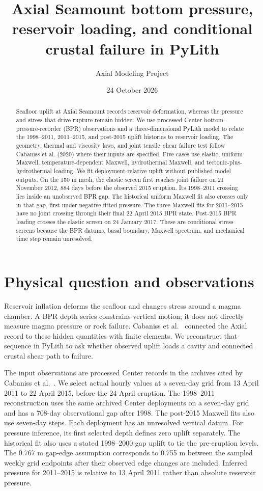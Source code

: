 \documentclass[10pt]{article}
\title{Axial Seamount bottom pressure, reservoir loading, and conditional crustal failure in PyLith}
\author{Axial Modeling Project}
\date{24 October 2026}
\begin{document}
\maketitle
\begin{abstract}
Seafloor uplift at Axial Seamount records reservoir deformation, whereas
the pressure and stress that drive rupture remain hidden. We use processed
Center bottom-pressure-recorder (BPR) observations and a three-dimensional
PyLith model to relate the 1998--2011, 2011--2015, and post-2015 uplift
histories to reservoir loading.
The geometry, thermal and viscosity laws, and joint tensile--shear failure
test follow Cabaniss et al. (2020) where their inputs are specified. Five
cases use elastic, uniform Maxwell, temperature-dependent Maxwell,
hydrothermal Maxwell, and tectonic-plus-hydrothermal loading. We fit
deployment-relative uplift without published model outputs. On the 150 m
mesh, the elastic screen first reaches joint failure on 21 November 2012,
884 days before the observed 2015 eruption. Its 1998--2011 crossing lies
inside an unobserved BPR gap. The historical uniform Maxwell fit also crosses
only in that gap, first under negative fitted pressure. The three Maxwell fits
for 2011--2015 have no joint crossing through their final 22 April 2015 BPR
state.
Post-2015 BPR loading crosses the elastic screen on 24 January 2017.
These are conditional stress screens because the BPR datums, basal boundary,
Maxwell spectrum, and mechanical time step remain unresolved.
\end{abstract}

\section{Physical question and observations}
Reservoir inflation deforms the seafloor and changes stress around a magma
chamber. A BPR depth series constrains vertical motion; it does not directly
measure magma pressure or rock failure. Cabaniss et al.\ \cite{cabaniss2020}
connected the Axial record to these hidden quantities with finite elements.
We reconstruct that sequence in PyLith to ask whether observed uplift loads
a cavity and connected crustal shear path to failure.

The input observations are processed Center records in the archives cited by
Cabaniss et al.\ \cite{chadwick,fox}. We select actual hourly values at a
seven-day grid from 13 April 2011 to 22 April 2015, before the 24 April
eruption. The 1998--2011 reconstruction uses the same archived Center
deployments on a seven-day grid and has a 708-day observational gap after
1998. The post-2015 Maxwell fits also use seven-day steps. Each deployment
has an unresolved vertical datum. For pressure inference, its first selected
depth defines zero uplift separately. The historical fit also uses a stated
1998--2000 gap uplift to tie the pre-eruption levels. The 0.767 m gap-edge
assumption corresponds to 0.755 m between the sampled weekly grid endpoints
after their observed edge changes are included. Inferred pressure for
2011--2015 is relative to 13 April 2011 rather than absolute reservoir
pressure.
\end{document}

